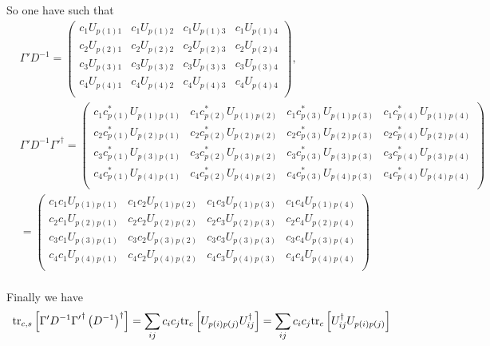 So one have such that
\begin{equation}
\begin{split}
&\Gamma ' D^{-1}=\left(\begin{array}{cccc}
c_1U_{p(1)1} & c_1U_{p(1)2} & c_1U_{p(1)3} & c_1U_{p(1)4} \\
c_2U_{p(2)1} & c_2U_{p(2)2} & c_2U_{p(2)3} & c_2U_{p(2)4} \\
c_3U_{p(3)1} & c_3U_{p(3)2} & c_3U_{p(3)3} & c_3U_{p(3)4} \\
c_4U_{p(4)1} & c_4U_{p(4)2} & c_4U_{p(4)3} & c_4U_{p(4)4} \\
\end{array}\right),\\
&\Gamma ' D^{-1} {\Gamma'}^{\dagger}=\left(\begin{array}{cccc}
c_1c^*_{p(1)}U_{p(1)p(1)} & c_1c^*_{p(2)}U_{p(1)p(2)} & c_1c^*_{p(3)}U_{p(1)p(3)} & c_1c^*_{p(4)}U_{p(1)p(4)} \\
c_2c^*_{p(1)}U_{p(2)p(1)} & c_2c^*_{p(2)}U_{p(2)p(2)} & c_2c^*_{p(3)}U_{p(2)p(3)} & c_2c^*_{p(4)}U_{p(2)p(4)} \\
c_3c^*_{p(1)}U_{p(3)p(1)} & c_3c^*_{p(2)}U_{p(3)p(2)} & c_3c^*_{p(3)}U_{p(3)p(3)} & c_3c^*_{p(4)}U_{p(3)p(4)} \\
c_4c^*_{p(1)}U_{p(4)p(1)} & c_4c^*_{p(2)}U_{p(4)p(2)} & c_4c^*_{p(3)}U_{p(4)p(3)} & c_4c^*_{p(4)}U_{p(4)p(4)} \\
\end{array}\right)\\
&=\left(\begin{array}{cccc}
c_1c_1U_{p(1)p(1)} & c_1c_2U_{p(1)p(2)} & c_1c_3U_{p(1)p(3)} & c_1c_4U_{p(1)p(4)} \\
c_2c_1U_{p(2)p(1)} & c_2c_2U_{p(2)p(2)} & c_2c_3U_{p(2)p(3)} & c_2c_4U_{p(2)p(4)} \\
c_3c_1U_{p(3)p(1)} & c_3c_2U_{p(3)p(2)} & c_3c_3U_{p(3)p(3)} & c_3c_4U_{p(3)p(4)} \\
c_4c_1U_{p(4)p(1)} & c_4c_2U_{p(4)p(2)} & c_4c_3U_{p(4)p(3)} & c_4c_4U_{p(4)p(4)} \\
\end{array}\right)\\
\end{split}
\end{equation}

Finally we have
\begin{equation}
\begin{split}
&{\rm tr}_{c,s}\left[\Gamma ' D^{-1}{\Gamma '}^{\dagger}\left(D^{-1}\right)^{\dagger}\right] = \sum _{ij}c_ic_j {\rm tr}_c\left[U_{p(i)p(j)}U^{\dagger}_{ij}\right]=\sum _{ij}c_ic_j {\rm tr}_c\left[U^{\dagger}_{ij}U_{p(i)p(j)}\right]
\end{split}
\end{equation}


